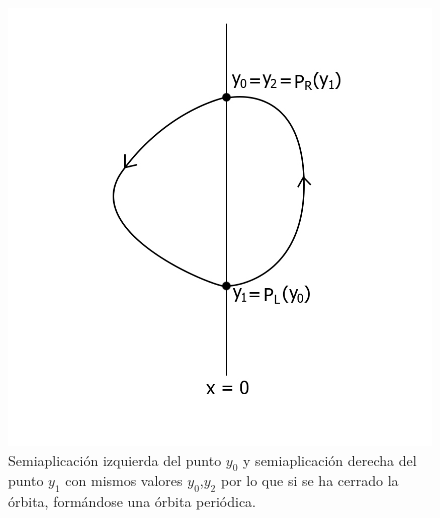\documentclass[12pt,a4paper]{report} %
\begin{document}
	\begin{figure}[h]
		\centering
 		\includegraphics[width=1\textwidth]{aplipoincareLRcerrado.jpg}
		\caption{Semiaplicación izquierda del punto $y_0$ y semiaplicación derecha del punto $y_1$ con mismos valores $y_0$,$y_2$ por lo que si se ha cerrado la órbita, formándose una órbita periódica.}
		\label{fig:aplipoincareLRcerrado}
	\end{figure}\smallskip
	
	\newpage
	
\end{document}
